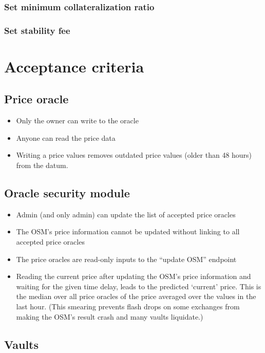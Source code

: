 \documentclass{article} %
\begin{document}
\subsubsection{Set minimum collateralization ratio}

\subsubsection{Set stability fee}

\section{Acceptance criteria}

\subsection{Price oracle}

\begin{itemize}
  \item Only the owner can write to the oracle
  \item Anyone can read the price data
  \item Writing a price values removes outdated price values (older than 48
    hours) from the datum.
\end{itemize}

\subsection{Oracle security module}

\begin{itemize}
  \item Admin (and only admin) can update the list of accepted price oracles
  \item The OSM's price information cannot be updated without linking to all
    accepted price oracles
  \item The price oracles are read-only inputs to the ``update OSM'' endpoint
  \item Reading the current price after updating the OSM's price information and
    waiting for the given time delay, leads to the predicted `current' price.
    This is the median over all price oracles of the price averaged over the
    values in the last hour. (This smearing prevents flash drops on some
    exchanges from making the OSM's result crash and many vaults liquidate.)
\end{itemize}

\subsection{Vaults}
\end{document}

